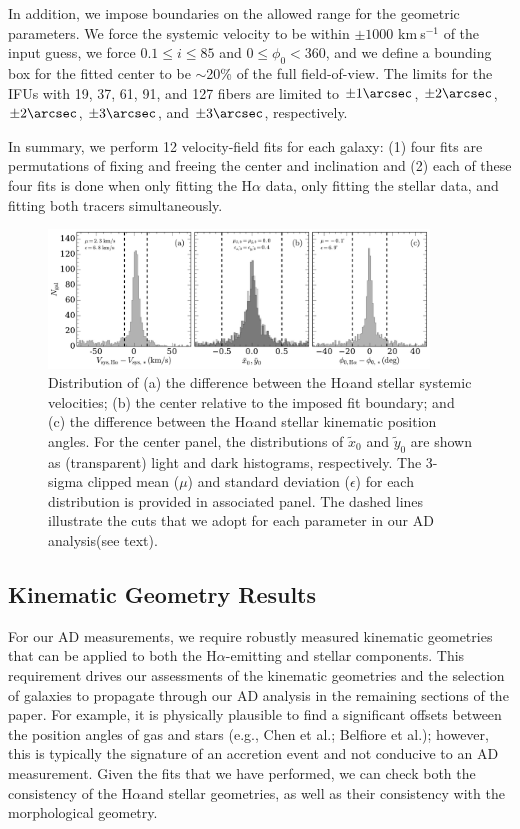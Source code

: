 \documentclass[apj,iop,revtex4,numberedappendix]{emulateapj}
\newcommand{\kms}{{km$~\!$s$^{-1}$}}
\newcommand{\halpha}{H$\alpha$}
\begin{document}
In addition, we impose boundaries on the allowed range for the geometric
parameters.  We force the systemic velocity to be within $\pm1000$
\kms{} of the input guess, we force $0.1\leq i \leq 85$ and
$0\leq\phi_0<360$, and we define a bounding box for the fitted center to
be $\sim$20\% of the full field-of-view.  The limits for the IFUs with
19, 37, 61, 91, and 127 fibers are limited to $\pm1\arcsec$,
$\pm2\arcsec$, $\pm2\arcsec$, $\pm3\arcsec$, and $\pm3\arcsec$,
respectively.

In summary, we perform 12 velocity-field fits for each galaxy: (1) four
fits are permutations of fixing and freeing the center and inclination
and (2) each of these four fits is done when only fitting the \halpha
data, only fitting the stellar data, and fitting both tracers
simultaneously.
%
\begin{figure}
%
\includegraphics[width=0.9\textwidth]{figs/sys_cen_pa.pdf}
%
\caption{
%
Distribution of (a) the difference between the \halpha and stellar
systemic velocities; (b) the center relative to the imposed fit
boundary; and (c) the difference between the \halpha and stellar kinematic
position angles.  For the center panel, the distributions of
$\tilde{x}_0$ and $\tilde{y}_0$ are shown as (transparent) light and
dark histograms, respectively.  The 3-sigma clipped mean ($\mu$) and
standard deviation ($\epsilon$) for each distribution is provided in
associated panel.  The dashed lines illustrate the cuts that we adopt
for each parameter in our AD analysis(see text).
%
}
%
\label{fig:sys_cen_pa_hist}
%
\end{figure}

\subsection{Kinematic Geometry Results}
\label{sec:kingeom}

For our AD measurements, we require robustly measured kinematic
geometries that can be applied to both the \halpha-emitting and stellar
components.  This requirement drives our assessments of the kinematic
geometries and the selection of galaxies to propagate through our AD
analysis in the remaining sections of the paper.  For example, it is
physically plausible to find a significant offsets between the position
angles of gas and stars (e.g., Chen et al.; Belfiore et al.); however,
this is typically the signature of an accretion event and not conducive
to an AD measurement.  Given the fits that we have performed, we can
check both the consistency of the \halpha and stellar geometries, as well
as their consistency with the morphological geometry.
\end{document}
